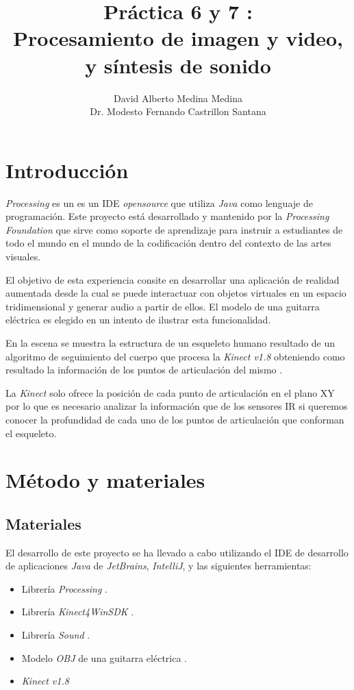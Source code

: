 \documentclass[10pt,a4paper]{report}
\author{David Alberto Medina Medina
	\\
	Dr. Modesto Fernando Castrillon Santana}
\title{Práctica 6 y 7 :\\ Procesamiento de imagen y video, \\y síntesis de sonido}
\begin{document}
	\maketitle
	\tableofcontents
	
	\chapter{Introducción}
	\textit{Processing} es un es un IDE \textit{opensource} que utiliza \textit{Java} como lenguaje de programación. Este proyecto está desarrollado y mantenido por la \textit{Processing Foundation} que sirve como soporte de aprendizaje para instruir a estudiantes de todo el mundo en el mundo de la codificación dentro del contexto de las artes visuales.
	
	El objetivo de esta experiencia consite en desarrollar una aplicación de realidad aumentada desde la cual se puede interactuar con objetos virtuales en un espacio tridimensional y generar audio a partir de ellos. El modelo de una guitarra eléctrica es elegido en un intento de ilustrar esta funcionalidad. 
	
	En la escena se muestra la estructura de un esqueleto humano resultado de un algoritmo de seguimiento del cuerpo que procesa la \textit{Kinect v1.8} obteniendo como resultado la información de los puntos de articulación del mismo \cite{control.kinect-controller}.
	
	La \textit{Kinect} solo ofrece la posición de cada punto de articulación en el plano XY por lo que es necesario analizar la información que de los sensores IR si queremos conocer la profundidad de cada uno de los puntos de articulación que conforman el esqueleto.
	
	\chapter{Método y materiales}
	\section{Materiales}
	El desarrollo de este proyecto se ha llevado a cabo utilizando el IDE de desarrollo de aplicaciones \textit{Java} de \textit{JetBrains}, \textit{IntelliJ}, y las siguientes herramientas:
	\begin{itemize}
		\item Librería \textit{Processing} \cite{processing-javadoc}.
		\item Librería \textit{Kinect4WinSDK} \cite{kinect4winsdk}.
		\item Librería \textit{Sound} \cite{sound-library}.
		\item Modelo \textit{OBJ} de una guitarra eléctrica \cite{3d-guitar-model}.
		\item \textit{Kinect v1.8} \cite{control.kinect-sdk}
	\end{itemize}
	
\end{document}
